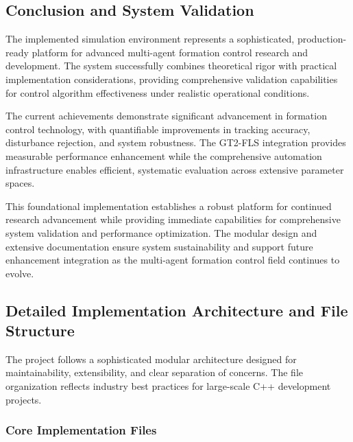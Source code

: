 \subsection*{Conclusion and System Validation}

The implemented simulation environment represents a sophisticated, production-ready platform for advanced multi-agent formation control research and development. The system successfully combines theoretical rigor with practical implementation considerations, providing comprehensive validation capabilities for control algorithm effectiveness under realistic operational conditions.

The current achievements demonstrate significant advancement in formation control technology, with quantifiable improvements in tracking accuracy, disturbance rejection, and system robustness. The GT2-FLS integration provides measurable performance enhancement while the comprehensive automation infrastructure enables efficient, systematic evaluation across extensive parameter spaces.

This foundational implementation establishes a robust platform for continued research advancement while providing immediate capabilities for comprehensive system validation and performance optimization. The modular design and extensive documentation ensure system sustainability and support future enhancement integration as the multi-agent formation control field continues to evolve.

\subsection*{Detailed Implementation Architecture and File Structure}

The project follows a sophisticated modular architecture designed for maintainability, extensibility, and clear separation of concerns. The file organization reflects industry best practices for large-scale C++ development projects.

\subsubsection*{Core Implementation Files}

